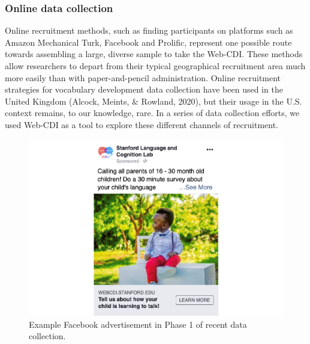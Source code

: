 \documentclass[
  english,
  ,man,floatsintext]{apa6}
\begin{document}
\hypertarget{online-data-collection}{%
\subsubsection{Online data collection}\label{online-data-collection}}

Online recruitment methods, such as finding participants on platforms such as Amazon Mechanical Turk, Facebook and Prolific, represent one possible route towards assembling a large, diverse sample to take the Web-CDI. These methods allow researchers to depart from their typical geographical recruitment area much more easily than with paper-and-pencil administration. Online recruitment strategies for vocabulary development data collection have been used in the United Kingdom (Alcock, Meints, \& Rowland, 2020), but their usage in the U.S. context remains, to our knowledge, rare. In a series of data collection efforts, we used Web-CDI as a tool to explore these different channels of recruitment.

\begin{figure}
\centering
\includegraphics{webcdi_paper_files/figure-latex/facebookad-1.pdf}
\caption{\label{fig:facebookad}Example Facebook advertisement in Phase 1 of recent data collection.}
\end{figure}
\end{document}
